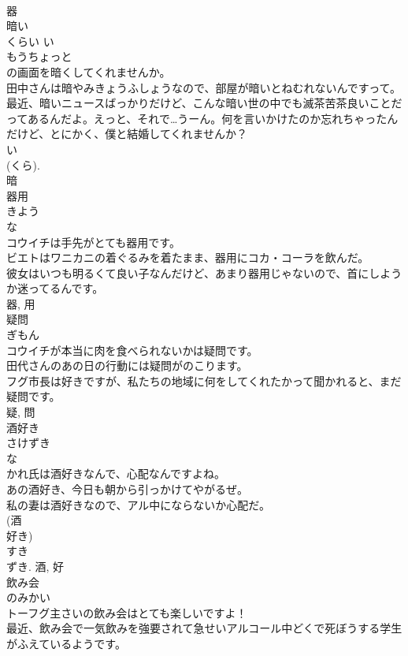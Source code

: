 \documentclass[8pt]{extreport}
\begin{document}
\begin{CJK}{UTF8}{min}
\\	器	
\\	暗い	
\\	くらい	い 
\\	もうちょっと
\\	の画面を暗くしてくれませんか。	
\\	田中さんは暗やみきょうふしょうなので、部屋が暗いとねむれないんですって。	
\\	最近、暗いニュースばっかりだけど、こんな暗い世の中でも滅茶苦茶良いことだってあるんだよ。えっと、それで…うーん。何を言いかけたのか忘れちゃったんだけど、とにかく、僕と結婚してくれませんか？	
\\	い 
\\	(くら). 
\\	暗	
\\	器用	
\\	きよう	
\\	な 
\\	コウイチは手先がとても器用です。	
\\	ビエトはワニカニの着ぐるみを着たまま、器用にコカ・コーラを飲んだ。	
\\	彼女はいつも明るくて良い子なんだけど、あまり器用じゃないので、首にしようか迷ってるんです。	
\\	器, 用	
\\	疑問	
\\	ぎもん	
\\	コウイチが本当に肉を食べられないかは疑問です。	
\\	田代さんのあの日の行動には疑問がのこります。	
\\	フグ市長は好きですが、私たちの地域に何をしてくれたかって聞かれると、まだ疑問です。	
\\	疑, 問	
\\	酒好き	
\\	さけずき	
\\	な 
\\	かれ氏は酒好きなんで、心配なんですよね。	
\\	あの酒好き、今日も朝から引っかけてやがるぜ。	
\\	私の妻は酒好きなので、アル中にならないか心配だ。	
\\	(酒 
\\	好き) 
\\	すき 
\\	ずき.	酒, 好	
\\	飲み会	
\\	のみかい	
\\	トーフグ主さいの飲み会はとても楽しいですよ！	
\\	最近、飲み会で一気飲みを強要されて急せいアルコール中どくで死ぼうする学生がふえているようです。	

\end{CJK}
\end{document}
